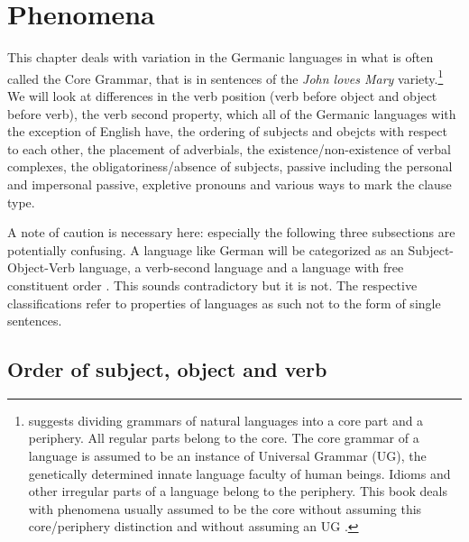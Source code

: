 
\settowidth{}


\chapter{Phenomena}


This chapter deals with variation in the Germanic languages in what is often called the Core
Grammar, that is in sentences of the \emph{John loves Mary} variety.\footnote{%
  \citet[--8]{Chomsky81a} suggests dividing grammars of natural languages into a core part and a periphery.
All regular parts belong to the core. The core grammar of a language is assumed to be an instance of
Universal Grammar (UG), the genetically determined innate language faculty of human beings. Idioms
and other irregular parts of a language belong to the periphery. This book deals with phenomena
usually assumed to be the core without assuming this core/periphery distinction and without assuming
an UG \citep{MuellerKernigkeit,MuellerCoreGram}.
} We will look at differences in
the verb position (verb before object and object before verb), the verb second property, which
all of the Germanic languages with the exception of English have, the ordering of subjects and
obejcts with respect to each other, the placement of adverbials, the existence/non-existence of
verbal complexes, the obligatoriness/absence of subjects, passive including the personal and
impersonal passive, expletive pronouns and various ways to mark the clause type.

A note of caution is necessary here: especially the following three subsections are potentially
confusing. A language like German will be categorized as an Subject-Object-Verb language, a verb-second language and
a language with free constituent order \citep{Haftka96a}. This sounds contradictory but it is not. The respective
classifications refer to properties of languages as such not to the form of single sentences.

\section{Order of subject, object and verb}
\label{sec-intro-svo}

